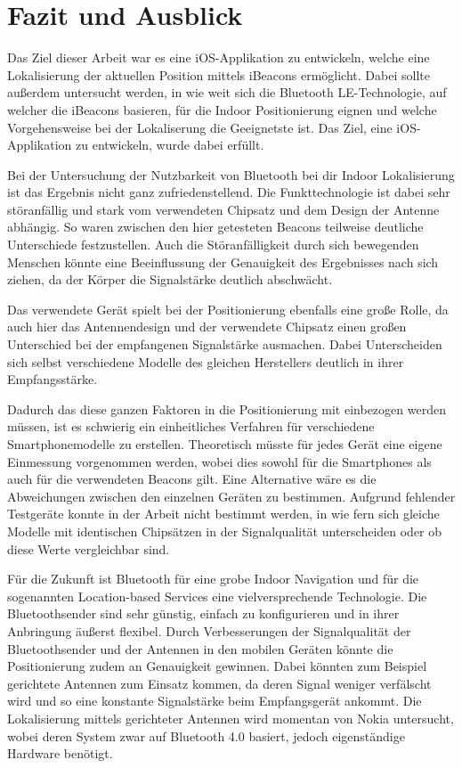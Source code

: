 \chapter{Fazit und Ausblick}
\label{chap:resume}

Das Ziel dieser Arbeit war es eine iOS-Applikation zu entwickeln, welche eine Lokalisierung der aktuellen Position mittels iBeacons ermöglicht. Dabei sollte außerdem untersucht werden, in wie weit sich die Bluetooth LE-Technologie, auf welcher die iBeacons basieren, für die Indoor Positionierung eignen und welche Vorgehensweise bei der Lokaliserung die Geeignetste ist. Das Ziel, eine iOS-Applikation zu entwickeln, wurde dabei erfüllt. 

Bei der Untersuchung der Nutzbarkeit von Bluetooth bei dir Indoor Lokalisierung ist das Ergebnis nicht ganz zufriedenstellend. Die Funkttechnologie ist dabei sehr störanfällig und stark vom verwendeten Chipsatz und dem Design der Antenne abhängig. So waren zwischen den hier getesteten Beacons teilweise deutliche Unterschiede festzustellen. Auch die Störanfälligkeit durch sich bewegenden Menschen könnte eine Beeinflussung der Genauigkeit des Ergebnisses nach sich ziehen, da der Körper die Signalstärke deutlich abschwächt.

Das verwendete Gerät spielt bei der Positionierung ebenfalls eine große Rolle, da auch hier das Antennendesign und der verwendete Chipsatz einen großen Unterschied bei der empfangenen Signalstärke ausmachen. Dabei Unterscheiden sich selbst verschiedene Modelle des gleichen Herstellers deutlich in ihrer Empfangsstärke. 

Dadurch das diese ganzen Faktoren in die Positionierung mit einbezogen werden müssen, ist es schwierig ein einheitliches Verfahren für verschiedene Smartphonemodelle zu erstellen. Theoretisch müsste für jedes Gerät eine eigene Einmessung vorgenommen werden, wobei dies sowohl für die Smartphones als auch für die verwendeten Beacons gilt.
Eine Alternative wäre es die Abweichungen zwischen den einzelnen Geräten zu bestimmen. Aufgrund fehlender Testgeräte konnte in der Arbeit nicht bestimmt werden, in wie fern sich gleiche Modelle mit identischen Chipsätzen in der Signalqualität unterscheiden oder ob diese Werte vergleichbar sind.

Für die Zukunft ist Bluetooth für eine grobe Indoor Navigation und für die sogenannten Location-based Services eine vielversprechende Technologie. Die Bluetoothsender sind sehr günstig, einfach zu konfigurieren und in ihrer Anbringung äußerst flexibel. Durch Verbesserungen der Signalqualität der Bluetoothsender und der Antennen in den mobilen Geräten könnte die Positionierung zudem an Genauigkeit gewinnen. Dabei könnten zum Beispiel gerichtete Antennen zum Einsatz kommen, da deren Signal weniger verfälscht wird und so eine konstante Signalstärke beim Empfangsgerät ankommt. Die Lokalisierung mittels gerichteter Antennen wird momentan von Nokia untersucht, wobei deren System zwar auf Bluetooth 4.0 basiert, jedoch eigenständige Hardware benötigt.

